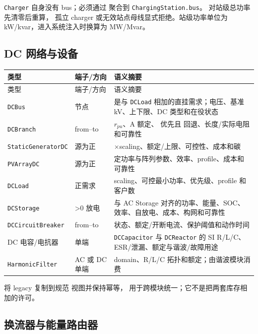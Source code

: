 \texttt{Charger} 自身没有 bus；必须通过  聚合到
\texttt{ChargingStation.bus}。 对站级总功率先清零后重算，
孤立 charger 或无效站点母线显式拒绝。站级功率单位为 kW/kvar，进入系统注入时换算为 MW/Mvar。

\subsection{DC 网络与设备}

\begin{center}\footnotesize
\begin{longtable}{@{}L{3.4cm}L{4.0cm}L{7.8cm}@{}}
\toprule 类型 & 端子/方向 & 语义摘要\\\midrule
\endfirsthead
\toprule 类型 & 端子/方向 & 语义摘要\\\midrule\endhead
\texttt{DCBus} & 节点 &  是与 \texttt{DCLoad} 相加的直挂需求；电压、基准 kV、上下限、DC 类型和在役状态\\
\texttt{DCBranch} & from--to & $r_{pu}$、A 额定、 优先且  回退、长度/实际电阻和可靠性\\
\texttt{StaticGeneratorDC} & 源为正 & $\times$scaling、额定/上限、可控性、成本和碳\\
\texttt{PVArrayDC} & 源为正 & 定功率与阵列参数、效率、profile、成本和可靠性\\
\texttt{DCLoad} & 正需求 & scaling、可控最小功率、优先级、profile 和客户数\\
\texttt{DCStorage} & >0 放电 & 与 AC Storage 对齐的功率、能量、SOC、效率、自放电、成本、构网和可靠性\\
\texttt{DCCircuitBreaker} & from--to & 状态、额定/开断电流、保护阈值和动作时间\\
DC 电容/电抗器 & 单端 & \texttt{DCCapacitor} 与 \texttt{DCReactor} 的 SI R/L/C、ESR/泄漏、额定与谐波/故障用途\\
\texttt{HarmonicFilter} & AC 或 DC 单端 & domain、R/L/C 拓扑和额定；由谐波模块消费\\
\bottomrule
\end{longtable}
\end{center}

 将 legacy  复制到规范  视图并保持幂等，
用于跨模块统一；它不是把两套库存相加的许可。

\subsection{换流器与能量路由器}

